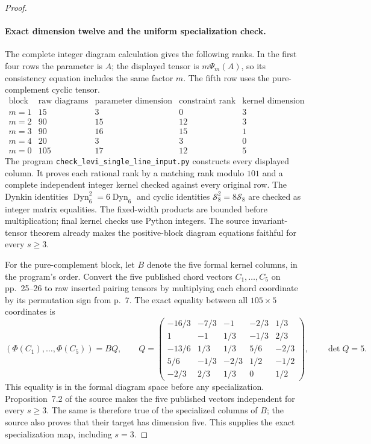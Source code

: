 \begin{proof}
\paragraph{Exact dimension twelve and the uniform specialization check.}
The complete integer diagram calculation gives the following ranks.
In the first four rows the parameter is $A$; the displayed tensor
is $m\Psi_m(A)$, so its consistency equation includes the same
factor $m$. The fifth row uses the pure-complement cyclic tensor.
\[
\begin{array}{c|r|r|r|r}
\text{block}&\text{raw diagrams}&\text{parameter dimension}
   &\text{constraint rank}&\text{kernel dimension}\\\hline
m=1&15&3&0&3\\
m=2&90&15&12&3\\
m=3&90&16&15&1\\
m=4&20&3&3&0\\
m=0&105&17&12&5
\end{array}
\]
The program \texttt{check\_levi\_single\_line\_input.py}
constructs every displayed column. It proves each rational rank
by a matching rank modulo $101$ and a complete independent
integer kernel checked against every original row. The Dynkin
identities $\operatorname{Dyn}_6^2=6\operatorname{Dyn}_6$
and cyclic identities $\mathcal S_8^2=8\mathcal S_8$ are checked
as integer matrix equalities. The fixed-width products are
bounded before multiplication; final kernel checks use Python
integers. The source invariant-tensor theorem already makes
the positive-block diagram equations faithful for every $s\geq3$.

For the pure-complement block, let $B$ denote the five formal
kernel columns, in the program's order. Convert the five published
chord vectors $C_1,\ldots,C_5$ on pp.~25--26 to raw inserted
pairing tensors by multiplying each chord coordinate by its
permutation sign from p.~7. The exact equality between all
$105\times5$ coordinates is
\[
 (\Phi(C_1),\ldots,\Phi(C_5))=B Q,\qquad
 Q=\begin{pmatrix}
 -16/3&-7/3&-1&-2/3&1/3\\
 1&-1&1/3&-1/3&2/3\\
 -13/6&1/3&1/3&5/6&-2/3\\
 5/6&-1/3&-2/3&1/2&-1/2\\
 -2/3&2/3&1/3&0&1/2
 \end{pmatrix},\qquad \det Q=5.
\]
This equality is in the formal diagram space before any
specialization. Proposition~7.2 of the source makes the five
published vectors independent for every $s\geq3$. The same is
therefore true of the specialized columns of $B$; the source
also proves that their target has dimension five. This supplies
the exact specialization map, including $s=3$.


\end{proof}
